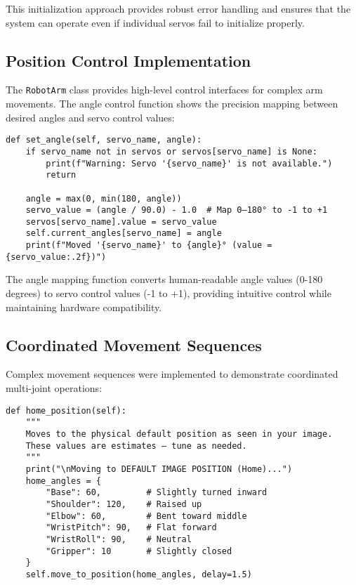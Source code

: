 \documentclass{book}
\begin{document}
\par\noindent This initialization approach provides robust error handling and ensures that the system can operate even if individual servos fail to initialize properly.

\subsection{Position Control Implementation}

\par\noindent The \texttt{RobotArm} class provides high-level control interfaces for complex arm movements. The angle control function shows the precision mapping between desired angles and servo control values:

\begin{lstlisting}[style=pythonstyle, caption={Servo Angle Control}]
def set_angle(self, servo_name, angle):
    if servo_name not in servos or servos[servo_name] is None:
        print(f"Warning: Servo '{servo_name}' is not available.")
        return

    angle = max(0, min(180, angle))
    servo_value = (angle / 90.0) - 1.0  # Map 0–180° to -1 to +1
    servos[servo_name].value = servo_value
    self.current_angles[servo_name] = angle
    print(f"Moved '{servo_name}' to {angle}° (value = {servo_value:.2f})")
\end{lstlisting}

\par\noindent The angle mapping function converts human-readable angle values (0-180 degrees) to servo control values (-1 to +1), providing intuitive control while maintaining hardware compatibility.

\subsection{Coordinated Movement Sequences}

\par\noindent Complex movement sequences were implemented to demonstrate coordinated multi-joint operations:

\begin{lstlisting}[style=pythonstyle, caption={Home Position Movement}]
def home_position(self):
    """
    Moves to the physical default position as seen in your image.
    These values are estimates — tune as needed.
    """
    print("\nMoving to DEFAULT IMAGE POSITION (Home)...")
    home_angles = {
        "Base": 60,         # Slightly turned inward
        "Shoulder": 120,    # Raised up
        "Elbow": 60,        # Bent toward middle
        "WristPitch": 90,   # Flat forward
        "WristRoll": 90,    # Neutral
        "Gripper": 10       # Slightly closed
    }
    self.move_to_position(home_angles, delay=1.5)
\end{lstlisting}
\end{document}
